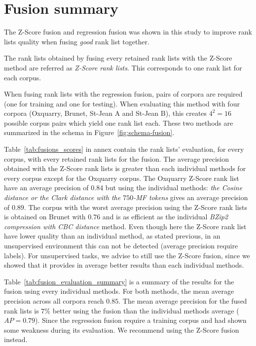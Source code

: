 \section{Fusion summary}

The Z-Score fusion and regression fusion was shown in this study to improve rank lists quality when fusing \textit{good} rank list together.

The rank lists obtained by fusing every retained rank lists with the Z-Score method are referred as \textit{Z-Score rank lists}.
This corresponds to one rank list for each corpus.

When fusing rank lists with the regression fusion, pairs of corpora are required (one for training and one for testing).
When evaluating this method with four corpora (Oxquarry, Brunet, St-Jean A and St-Jean B), this creates $4^2 = 16$ possible corpus pairs which yield one rank list each.
These two methods are summarized in the schema in Figure~\ref{fig:schema-fusion}.

Table~\ref{tab:fusions_scores} in annex contain the rank lists' evaluation, for every corpus, with every retained rank lists for the fusion.
The average precision obtained with the Z-Score rank lists is greater than each individual methods for every corpus except for the Oxquarry corpus.
The Oxquarry Z-Score rank list have an average precision of 0.84 but using the individual methods: \textit{the Cosine distance or the Clark distance with the $750$-MF tokens} gives an average precision of $0.89$.
The corpus with the worst average precision using the Z-Score rank lists is obtained on Brunet with $0.76$ and is as efficient as the individual \textit{BZip2 compression with CBC distance} method.
Even though here the Z-Score rank list have lower quality than an individual method, as stated previous, in an unsupervised environment this can not be detected (average precision require labels).
For unsupervised tasks, we advise to still use the Z-Score fusion, since we showed that it provides in average better results than each individual methods.

Table~\ref{tab:fusion_evaluation_summary} is a summary of the results for the fusion using every individual methods.
For both methods, the mean average precision across all corpora reach $0.85$.
The mean average precision for the fused rank lists is $7\%$ better using the fusion than the individual methods average ($AP = 0.79$).
Since the regression fusion require a training corpus and had shown some weakness during its evaluation.
We recommend using the Z-Score fusion instead.

